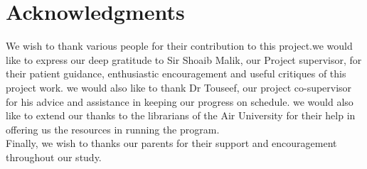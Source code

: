 \chapter*{Acknowledgments}

We wish to thank various people for their contribution to this project.we would like to express our deep gratitude to Sir Shoaib Malik, our Project supervisor, for their patient guidance, enthusiastic encouragement and useful critiques of this project work. we would also like to thank Dr Touseef, our project co-supervisor for his advice and assistance in keeping our progress on schedule. we would also like to extend our thanks to the librarians of the Air University for their help in offering us the resources in running the program. 
\\ Finally, we wish to thanks our parents for their support and encouragement throughout our study.


\vspace{10mm}



